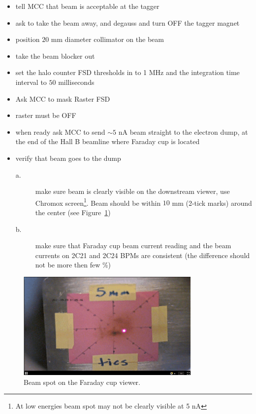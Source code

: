\begin{itemize}
\item tell MCC that beam is acceptable at the tagger
\item ask to take the beam away, and degauss and turn OFF the tagger magnet 
\item position $20$ mm diameter collimator on the beam 
\item take the beam blocker out
\item set the halo counter FSD thresholds in to 1 MHz and the integration time interval to $50$ milliseconds
\item Ask MCC to mask Raster FSD
\item raster must be OFF
\item when ready ask MCC to send $\sim 5$ nA beam straight to the electron dump, at the end of the Hall B beamline where Faraday cup is located
\item verify that beam goes to the dump 
\begin{description}
\item[a.] make sure beam is clearly visible on the downstream viewer, use Chromox screen\footnote{At low energies beam spot may not be clearly visible at 5 nA}. Beam should be within $10$ mm (2-tick marks) around the center (see Figure~\ref{fig:FC_spot})
\item[b.] make sure that Faraday cup beam current reading and the beam currents on 2C21 and 2C24 BPMs are consistent (the difference  should not be more then few \%)
\end{description}
\end{itemize}
\begin{figure}[htb!]
\centering
\includegraphics[width=0.8\textwidth]{FC_viewer.pdf}
\caption{Beam spot on the Faraday cup viewer.}
\label{fig:FC_spot}
\end{figure}

